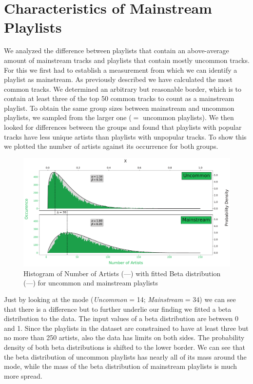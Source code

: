 \section{Characteristics of Mainstream Playlists}
We analyzed the difference between playlists that contain an above-average amount of mainstream tracks and playlists that contain mostly uncommon tracks. For this we first had to establish a measurement from which we can identify a playlist as mainstream. As previously described we have calculated the most common tracks. We determined an arbitrary but reasonable border, which is to contain at least three of the top 50 common tracks to count as a mainstream playlist. To obtain the same group sizes between mainstream and uncommon playlists, we sampled from the larger one ($=$ uncommon playlists). We then looked for differences between the groups and found that playlists with popular tracks have less unique artists than playlists with unpopular tracks. To show this we plotted the number of artists against its occurrence for both groups.

\begin{figure}[ht]
    \centering
    \includegraphics[width=\textwidth]{fig/pop_unpop_artist.pdf}
    \caption{Histogram of Number of Artists (\textcolor{spotifygreen}{---}) with fitted Beta distribution (\textcolor{black}{---}) for uncommon and mainstream playlists}
    \label{fig:pop_unppo_artist}
\end{figure}

Just by looking at the mode (\textit{Uncommon} = 14; \textit{Mainstream} = 34) we can see that there is a difference but to further underlie our finding we fitted a beta distribution to the data. The input values of a beta distribution are between 0 and 1. Since the playlists in the dataset are constrained to have at least three but no more than 250 artists, also the data has limits on both sides. The probability density of both beta distributions is shifted to the lower border. We can see that the beta distribution of uncommon playlists has nearly all of its mass around the mode, while the mass of the beta distribution of mainstream playlists is much more spread.

